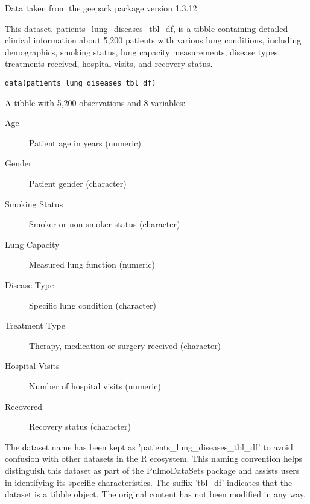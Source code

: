\documentclass[a4paper]{book}
\begin{document}
%
\begin{Source}
Data taken from the geepack package version 1.3.12
\end{Source}
%
\begin{Description}
This dataset, patients\_lung\_diseases\_tbl\_df, is a tibble containing detailed clinical information
about 5,200 patients with various lung conditions, including demographics, smoking status,
lung capacity measurements, disease types, treatments received, hospital visits, and recovery status.
\end{Description}
%
\begin{Usage}
\begin{verbatim}
data(patients_lung_diseases_tbl_df)
\end{verbatim}
\end{Usage}
%
\begin{Format}
A tibble with 5,200 observations and 8 variables:
\begin{description}

\item[Age] Patient age in years (numeric)
\item[Gender] Patient gender (character)
\item[Smoking Status] Smoker or non-smoker status (character)
\item[Lung Capacity] Measured lung function (numeric)
\item[Disease Type] Specific lung condition (character)
\item[Treatment Type] Therapy, medication or surgery received (character)
\item[Hospital Visits] Number of hospital visits (numeric)
\item[Recovered] Recovery status (character)

\end{description}

\end{Format}
%
\begin{Details}
The dataset name has been kept as 'patients\_lung\_diseases\_tbl\_df' to avoid confusion with other datasets
in the R ecosystem. This naming convention helps distinguish this dataset as part of the
PulmoDataSets package and assists users in identifying its specific characteristics.
The suffix 'tbl\_df' indicates that the dataset is a tibble object. The original content has not been modified
in any way.
\end{Details}
\end{document}
